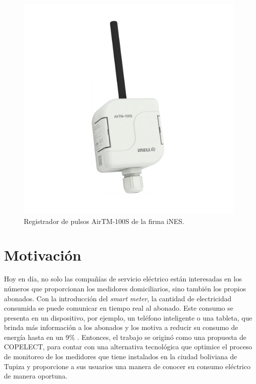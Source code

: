\begin{itemize}
	\begin{figure}[h]
		\centering
		\includegraphics[scale=0.22]{./Figures/airtm-100s.png}
		\caption{Registrador de pulsos AirTM-100S de la firma iNES\protect\footnotemark.}
		\label{fig:cuadradoAzul}
	\end{figure}	
\end{itemize}



\section{Motivación}

Hoy en día, no solo las compañías de servicio eléctrico están interesadas en los números que proporcionan los medidores domiciliarios, sino también los propios abonados. Con la introducción del \textit{smart meter}, la cantidad de electricidad consumida se puede comunicar en tiempo real al abonado. Este consumo se presenta en un dispositivo, por ejemplo, un teléfono inteligente o una tableta, que brinda más información a los abonados y los motiva a reducir su consumo de energía hasta en un 9\% \citep{WEBSITE:8}. Entonces, el trabajo se originó como una propuesta de COPELECT, para contar con una alternativa tecnológica que optimice el proceso de monitoreo de los medidores que tiene instalados en la ciudad boliviana de Tupiza y proporcione a sus usuarios una manera de conocer su consumo eléctrico de manera oportuna.

